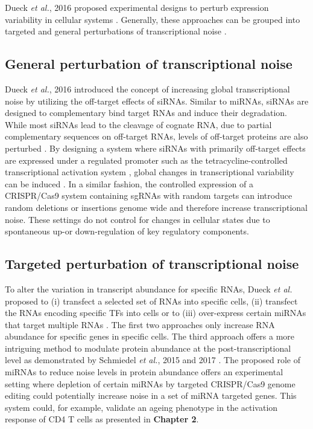 Dueck \emph{et al.}, 2016 proposed experimental designs to perturb expression variability in cellular systems \citep{Dueck2016}. Generally, these approaches can be grouped into targeted and general perturbations of transcriptional noise \citep{Dueck2016}.

\subsection{General perturbation of transcriptional noise} 

Dueck \emph{et al.}, 2016 introduced the concept of increasing global transcriptional noise by utilizing the off-target effects of \glspl{siRNA}. Similar to miRNAs, siRNAs are designed to complementary bind target RNAs and induce their degradation. While most siRNAs lead to the cleavage of cognate RNA, due to partial complementary sequences on off-target RNAs, levels of off-target proteins are also perturbed \citep{Scacheri2004}. By designing a system where siRNAs with primarily off-target effects are expressed under a regulated promoter such as the tetracycline-controlled transcriptional activation system \citep{Gossen1995}, global changes in transcriptional variability can be induced \citep{Dueck2016}. In a similar fashion, the controlled expression of a CRISPR/Cas9 system containing \glspl{sgRNA} with random targets can introduce random deletions or insertions genome wide and therefore increase transcriptional noise. These settings do not control for changes in cellular states due to spontaneous up-or down-regulation of key regulatory components. \\

\subsection{Targeted perturbation of transcriptional noise} 

To alter the variation in transcript abundance for specific RNAs, Dueck \emph{et al.} proposed to (i) transfect a selected set of RNAs into specific cells, (ii) transfect the RNAs encoding specific TFs into cells or to (iii) over-express certain miRNAs that target multiple RNAs \cite{Dueck2016}. The first two approaches only increase RNA abundance for specific genes in specific cells. The third approach offers a more intriguing method to modulate protein abundance at the post-transcriptional level as demonstrated by Schmiedel \emph{et al.}, 2015 and 2017 \cite{Schmiedel2015, Schmiedel2017}. The proposed role of miRNAs to reduce noise levels in protein abundance offers an experimental setting where depletion of certain miRNAs by targeted CRISPR/Cas9 genome editing could potentially increase noise in a set of miRNA targeted genes. This system could, for example, validate an ageing phenotype in the activation response of CD4\plus{} T cells as presented in \textbf{Chapter 2}. 


